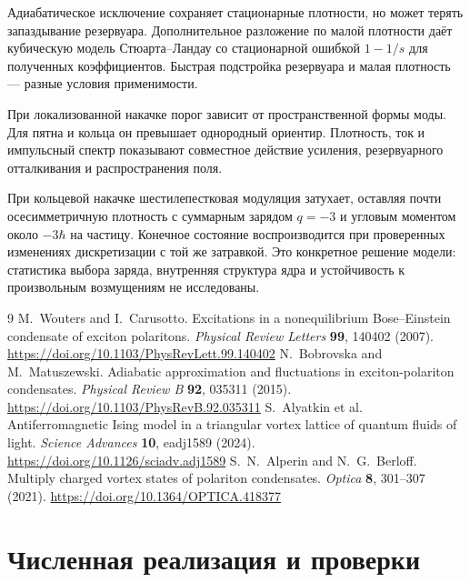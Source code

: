 \documentclass[12pt,a4paper]{article}
\begin{document}
Адиабатическое исключение сохраняет стационарные плотности, но может терять запаздывание резервуара. Дополнительное разложение по малой плотности даёт кубическую модель Стюарта--Ландау со стационарной ошибкой $1-1/s$ для полученных коэффициентов. Быстрая подстройка резервуара и малая плотность --- разные условия применимости.

При локализованной накачке порог зависит от пространственной формы моды. Для пятна и кольца он превышает однородный ориентир. Плотность, ток и импульсный спектр показывают совместное действие усиления, резервуарного отталкивания и распространения поля.

При кольцевой накачке шестилепестковая модуляция затухает, оставляя почти осесимметричную плотность с суммарным зарядом \mbox{$q=-3$} и угловым моментом около $-3 \hbar$ на частицу. Конечное состояние воспроизводится при проверенных изменениях дискретизации с той же затравкой. Это конкретное решение модели: статистика выбора заряда, внутренняя структура ядра и устойчивость к произвольным возмущениям не исследованы.

\clearpage

\begin{thebibliography}{9}
M.~Wouters and I.~Carusotto.
Excitations in a nonequilibrium Bose--Einstein condensate of exciton polaritons.
\textit{Physical Review Letters} \textbf{99}, 140402 (2007).
\url{https://doi.org/10.1103/PhysRevLett.99.140402}
N.~Bobrovska and M.~Matuszewski.
Adiabatic approximation and fluctuations in exciton-polariton condensates.
\textit{Physical Review B} \textbf{92}, 035311 (2015).
\url{https://doi.org/10.1103/PhysRevB.92.035311}
S.~Alyatkin et al.
Antiferromagnetic Ising model in a triangular vortex lattice of quantum fluids of light.
\textit{Science Advances} \textbf{10}, eadj1589 (2024).
\url{https://doi.org/10.1126/sciadv.adj1589}
S.~N.~Alperin and N.~G.~Berloff.
Multiply charged vortex states of polariton condensates.
\textit{Optica} \textbf{8}, 301--307 (2021).
\url{https://doi.org/10.1364/OPTICA.418377}
\end{thebibliography}

\clearpage

\appendix

\renewcommand{\thesection}{Приложение А.}
\renewcommand{\thesubsection}{А.\arabic{subsection}}

\section{Численная реализация и проверки}\label{sec:A}
\end{document}
